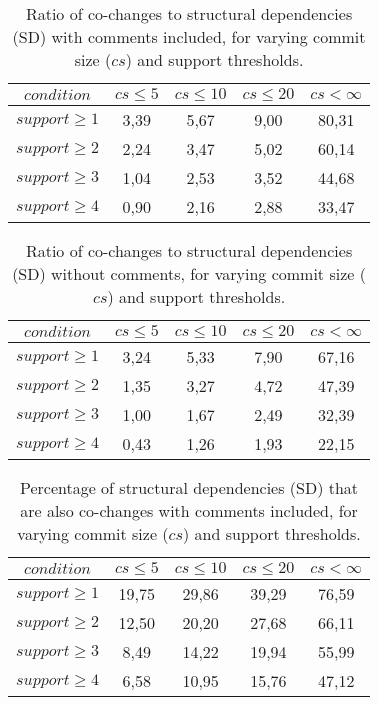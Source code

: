\begin{table}[!h]
\renewcommand{\arraystretch}{1}
\caption{Ratio of co-changes to structural dependencies (SD) with comments included, for varying commit size ($cs$) and support thresholds.}
\label{tab:ratio:comm}
\centering
\begin{tabular}{|c|c|c|c|c|}
\hline
$condition$	      &	$cs\leq 5$	&	$cs\leq 10$	&	$cs\leq 20$	&	$cs<\infty$	\\
\hline
$support\geq 1$	&	3,39	&	5,67	&	9,00	&	80,31	\\
$support\geq 2$	&	2,24	&	3,47	&	5,02	&	60,14	\\
$support\geq 3$	&	1,04	&	2,53	&	3,52	&	44,68	\\
$support\geq 4$	&	0,90	&	2,16	&	2,88	&	33,47	\\
\hline
\end{tabular}
\end{table}

\begin{table}[!h]
\renewcommand{\arraystretch}{1}
\caption{Ratio of co-changes to structural dependencies (SD) without comments, for varying commit size ($cs$) and support thresholds.}
\label{tab:ratio:nocomm}
\centering
\begin{tabular}{|c|c|c|c|c|}
\hline
$condition$	      &	$cs\leq 5$	&	$cs\leq 10$	&	$cs\leq 20$	&	$cs< \infty$	\\
\hline
$support\geq 1$	&	3,24	&	5,33	&	7,90	&	67,16	\\
$support\geq 2$	&	1,35	&	3,27	&	4,72	&	47,39	\\
$support\geq 3$	&	1,00	&	1,67	&	2,49	&	32,39	\\
$support\geq 4$	&	0,43	&	1,26	&	1,93	&	22,15	\\
\hline
\end{tabular}
\end{table}

\begin{table}[!h]
\renewcommand{\arraystretch}{1}
\caption{Percentage of structural dependencies (SD) that are also co-changes with comments included, for varying commit size ($cs$) and support thresholds.}
\label{tab:percSD:comm}
\centering
\begin{tabular}{|c|c|c|c|c|}
\hline
$condition$	      &	$cs\leq 5$	&	$cs\leq 10$	&	$cs\leq 20$	&	$cs< \infty$	\\
\hline
$support\geq 1$	&	19,75	&	29,86	&	39,29	&	76,59	\\
$support\geq 2$	&	12,50	&	20,20	&	27,68	&	66,11	\\
$support\geq 3$	&	8,49	&	14,22	&	19,94	&	55,99	\\
$support\geq 4$	&	6,58	&	10,95	&	15,76	&	47,12	\\
\hline
\end{tabular}
\end{table}

